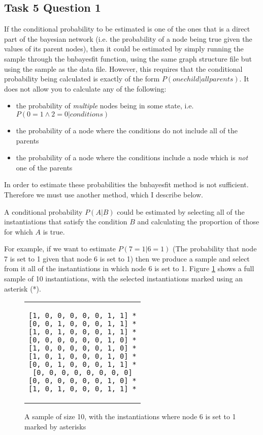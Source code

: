 \documentclass[a4paper,11pt]{article}
\begin{document}
\subsection{Task 5 Question 1}

If the conditional probability to be estimated is one of the ones that is a direct part of the bayesian network (i.e. the probability of a node being true given the values of its parent nodes), then it could be estimated by simply running the sample through the bnbayesfit function, using the same graph structure file but using the sample as the data file.  However, this requires that the conditional probability being calculated is exactly of the form $P(onechild|allparents)$.  It does not allow you to calculate any of the following:
\begin{itemize}
	\item the probability of \textit{multiple} nodes being in some state, i.e. $P(0=1\wedge{}2=0|conditions)$
	\item the probability of a node where the conditions do not include all of the parents
	\item the probability of a node where the conditions include a node which is \textit{not} one of the parents
\end{itemize}
In order to estimate these probabilities the bnbayesfit method is not sufficient.  Therefore we must use another method, which I describe below.

A conditional probability $P(A|B)$ could be estimated by selecting all of the instantiations that satisfy the condition $B$ and calculating the proportion of those for which $A$ is true.

For example, if we want to estimate $P(7=1|6=1)$ (The probability that node 7 is set to 1 given that node 6 is set to 1) then we produce a sample and select from it all of the instantiations in which node 6 is set to 1.  Figure \ref{sample1} shows a full sample of 10 instantiations, with the selected instantiations marked using an asterisk (*).

\begin{figure}[h]
	\centering
	\lstset{basicstyle=\ttfamily}
	\begin{tabular}{c}
	\begin{lstlisting}
[1, 0, 0, 0, 0, 0, 1, 1] *
[0, 0, 1, 0, 0, 0, 1, 1] *
[1, 0, 1, 0, 0, 0, 1, 1] *
[0, 0, 0, 0, 0, 0, 1, 0] *
[1, 0, 0, 0, 0, 0, 1, 0] *
[1, 0, 1, 0, 0, 0, 1, 0] *
[0, 0, 1, 0, 0, 0, 1, 1] *
[0, 0, 0, 0, 0, 0, 0, 0]
[0, 0, 0, 0, 0, 0, 1, 0] *
[1, 0, 1, 0, 0, 0, 1, 1] *
	\end{lstlisting}
	\end{tabular}
	\caption{A sample of size 10, with the instantiations where node 6 is set to 1 marked by asterisks}
	\label{sample1}
\end{figure}
\end{document}

